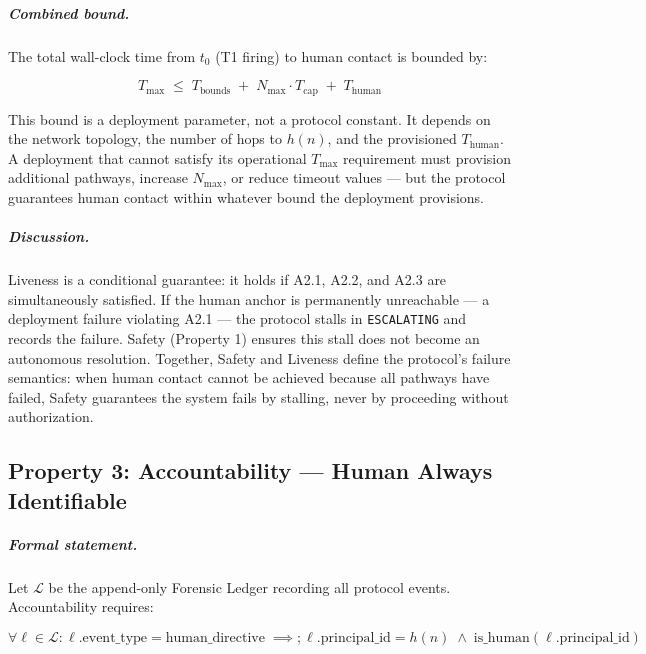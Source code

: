 \subparagraph{Combined bound.} The total wall-clock time from $t_0$ (T1 firing) to human contact is bounded by:

\begin{equation}
T_{\max} \;\leq\; T_{\text{bounds}} \;+\; N_{\max} \cdot T_{\text{cap}} \;+\; T_{\text{human}}
\end{equation}

This bound is a deployment parameter, not a protocol constant. It depends on the network topology, the number of hops to $h(n)$, and the provisioned $T_{\text{human}}$. A deployment that cannot satisfy its operational $T_{\max}$ requirement must provision additional pathways, increase $N_{\max}$, or reduce timeout values — but the protocol guarantees human contact within whatever bound the deployment provisions.

\subparagraph{Discussion.} Liveness is a conditional guarantee: it holds if A2.1, A2.2, and A2.3 are simultaneously satisfied. If the human anchor is permanently unreachable — a deployment failure violating A2.1 — the protocol stalls in \texttt{ESCALATING} and records the failure. Safety (Property 1) ensures this stall does not become an autonomous resolution. Together, Safety and Liveness define the protocol's failure semantics: when human contact cannot be achieved because all pathways have failed, Safety guarantees the system fails by stalling, never by proceeding without authorization.

\subsection{Property 3: Accountability — Human Always Identifiable}


\subparagraph{Formal statement.} Let $\mathcal{L}$ be the append-only Forensic Ledger recording all protocol events. Accountability requires:

\begin{equation}
\forall \ell \in \mathcal{L} : \ell.\text{event\_type} = \text{human\_directive}
\;\implies;
\ell.\text{principal\_id} = h(n)
\;\land\;
\text{is\_human}(\ell.\text{principal\_id})
\end{equation}

